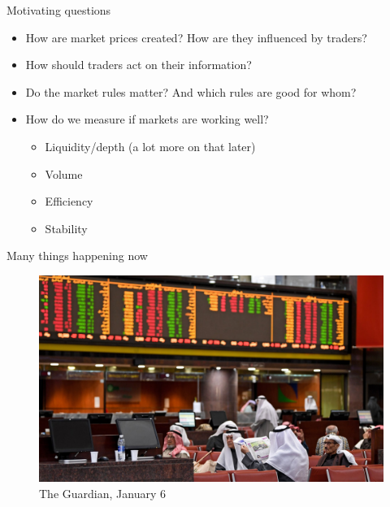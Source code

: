 \begin{frame}{Motivating questions}
\begin{itemize}
	\item How are market prices created? How are they influenced by traders?
	\item How should traders act on their information?
	\item Do the market rules matter? And which rules are good for whom?
	\item How do we measure if markets are working well?
	\begin{itemize}
		\item Liquidity/depth (a lot more on that later)
		\item Volume
		\item Efficiency
		\item Stability
	\end{itemize}
\end{itemize}
\end{frame}


\begin{frame}{Many things happening now}
\begin{figure}
	\includegraphics[width=.8\linewidth]{pics/markets2020}
	\caption{The Guardian, January 6}
\end{figure}
\end{frame}


